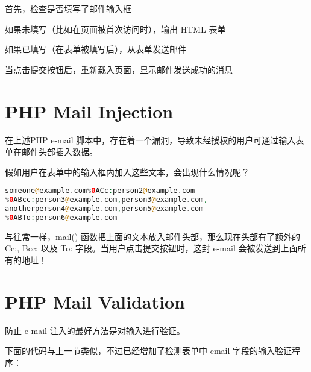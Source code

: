 \begin{compactenum}
\item 首先，检查是否填写了邮件输入框
\item 如果未填写（比如在页面被首次访问时），输出 HTML 表单
\item 如果已填写（在表单被填写后），从表单发送邮件
\item 当点击提交按钮后，重新载入页面，显示邮件发送成功的消息
\end{compactenum}




\section{PHP Mail Injection}

在上述PHP e-mail 脚本中，存在着一个漏洞，导致未经授权的用户可通过输入表单在邮件头部插入数据。

假如用户在表单中的输入框内加入这些文本，会出现什么情况呢？

\begin{lstlisting}[language=PHP]
someone@example.com%0ACc:person2@example.com
%0ABcc:person3@example.com,person3@example.com,
anotherperson4@example.com,person5@example.com
%0ABTo:person6@example.com
\end{lstlisting}

与往常一样，mail() 函数把上面的文本放入邮件头部，那么现在头部有了额外的 Cc:, Bcc: 以及 To: 字段。当用户点击提交按钮时，这封 e-mail 会被发送到上面所有的地址！


\section{PHP Mail Validation}


防止 e-mail 注入的最好方法是对输入进行验证。


下面的代码与上一节类似，不过已经增加了检测表单中 email 字段的输入验证程序：

